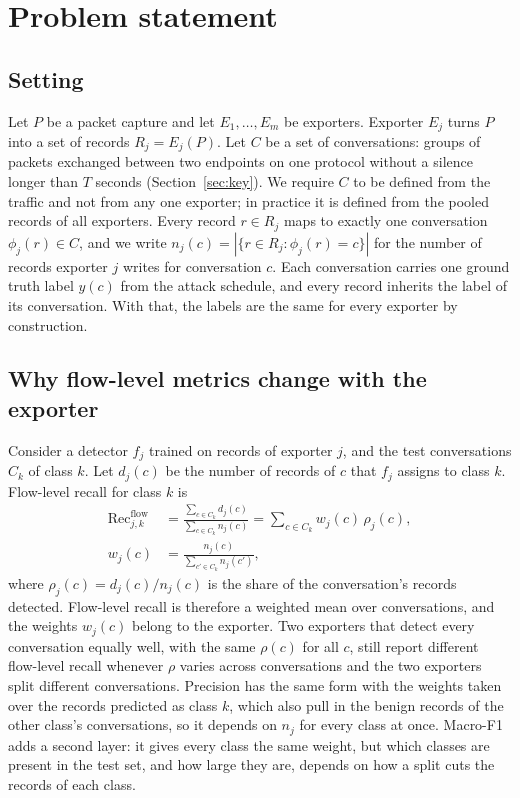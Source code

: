 \documentclass[pdflatex,sn-mathphys-num]{sn-jnl}
\theoremstyle{thmstyleone}%
\theoremstyle{thmstylethree}%
\begin{document}
\section{Problem statement}\label{sec:problem}

\subsection{Setting}

Let $P$ be a packet capture and let $E_1,\dots,E_m$ be exporters. Exporter $E_j$ turns $P$ into a set of records $R_j = E_j(P)$. Let $C$ be a set of conversations: groups of packets exchanged between two endpoints on one protocol without a silence longer than $T$ seconds (Section~\ref{sec:key}). We require $C$ to be defined from the traffic and not from any one exporter; in practice it is defined from the pooled records of all exporters. Every record $r \in R_j$ maps to exactly one conversation $\phi_j(r) \in C$, and we write $n_j(c) = |\{r \in R_j : \phi_j(r) = c\}|$ for the number of records exporter $j$ writes for conversation $c$. Each conversation carries one ground truth label $y(c)$ from the attack schedule, and every record inherits the label of its conversation. With that, the labels are the same for every exporter by construction.

\subsection{Why flow-level metrics change with the exporter}

Consider a detector $f_j$ trained on records of exporter $j$, and the test conversations $C_k$ of class $k$. Let $d_j(c)$ be the number of records of $c$ that $f_j$ assigns to class $k$. Flow-level recall for class $k$ is
\begin{equation}\label{eq:flowrecall}
\begin{aligned}
\mathrm{Rec}^{\mathrm{flow}}_{j,k} &= \frac{\sum_{c \in C_k} d_j(c)}{\sum_{c \in C_k} n_j(c)} = \sum_{c \in C_k} w_j(c)\, \rho_j(c),\\
w_j(c) &= \frac{n_j(c)}{\sum_{c' \in C_k} n_j(c')},
\end{aligned}
\end{equation}
where $\rho_j(c) = d_j(c)/n_j(c)$ is the share of the conversation's records detected. Flow-level recall is therefore a weighted mean over conversations, and the weights $w_j(c)$ belong to the exporter. Two exporters that detect every conversation equally well, with the same $\rho(c)$ for all $c$, still report different flow-level recall whenever $\rho$ varies across conversations and the two exporters split different conversations. Precision has the same form with the weights taken over the records predicted as class $k$, which also pull in the benign records of the other class's conversations, so it depends on $n_j$ for every class at once. Macro-F1 adds a second layer: it gives every class the same weight, but which classes are present in the test set, and how large they are, depends on how a split cuts the records of each class.
\end{document}
